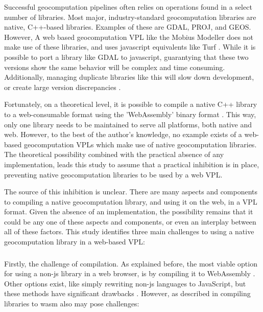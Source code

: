 Successful geocomputation pipelines often relies on operations found in a select number of libraries. 
Most major, industry-standard geocomputation libraries are native, C++-based libraries. 
Examples of these are GDAL, PROJ, and GEOS. 
However, A web based geocomputation VPL like the Mobius Modeller does not make use of these libraries, and uses javascript equivalents like Turf \citep{turf_contributors_turfjs_2022}.
While it is possible to port a library like GDAL to javascript, guarantying that these two versions show the same behavior will be complex and time consuming. Additionally, managing duplicate libraries like this will slow down development, or create large version discrepancies \citep{ammann_maplibre-rs_2022}.

Fortunately, on a theoretical level, it is possible to compile a native C++ library to a web-consumable format using the 'WebAssembly' binary format \citep{haas_bringing_2017}.
This way, only one library needs to be maintained to serve all platforms, both native and web. 
However, to the best of the author's knowledge, no example exists of a web-based geocomputation VPLs which make use of native geocomputation libraries.
The theoretical possibility combined with the practical absence of any implementation, leads this study to assume that a practical inhibition is in place, preventing native geocomputation libraries to be used by a web VPL.

The source of this inhibition is unclear. 
There are many aspects and components to compiling a native geocomputation library, and using it on the web, in a VPL format. 
Given the absence of an implementation, the possibility remains that it could be any one of these aspects and components, or even an interplay between all of these factors. 
This study identifies three main challenges to using a native geocomputation library in a web-based VPL:

\subsubsection*{\mySubRQTwoTitle}


Firstly, the challenge of compilation. 
As explained before, the most viable option for using a non-js library in a web browser, is by compiling it to WebAssembly \citep{haas_bringing_2017}.
Other options exist, like simply rewriting non-js languages to JavaScript, but these methods have significant drawbacks \citep{haas_bringing_2017,jangda_not_2019}.
However, as described in  compiling libraries to \ac{wasm} also may pose challenges:

